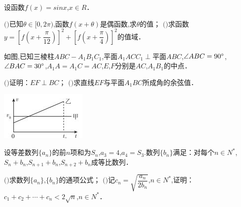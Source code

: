 \question[14] 设函数$f(x)=sinx$,$x \in R$．
\begin{subquestions}
    \subquestion $($$)$已知$ \theta  \in [0 , 2 \pi )$,函数$f(x+ \theta )$是偶函数,求$ \theta $的值；
    \subquestion $($$)$求函数$y=[f(x+ \dfrac { \pi }{12} )] ^{2} +[f(x+ \dfrac { \pi }{4} )] ^{2}$的值域．
\end{subquestions}
\begin{solution}{6cm}

\end{solution}



\question[15] 如图,已知三棱柱$ABC-A _{1} B _{1} C _{1}$,平面$A _{1} ACC _{1}  \perp $平面$ABC$,$ \angle ABC=90^{\small \circ}$,$ \angle BAC=30^{\small \circ}$,$A _{1} A=A _{1} C=AC$,$E$,$F$分别是$AC$,$A _{1} B _{1}$的中点．
\begin{subquestions}
    \subquestion $($$)$证明：$EF \perp BC$；
    \subquestion $($$)$求直线$EF$与平面$A _{1} BC$所成角的余弦值．
\end{subquestions}
\begin{center}
    \includegraphics[]{img/image1.jpeg}
\end{center}
\begin{solution}{6cm}

\end{solution}



\question[15] 设等差数列$\{a _{n} \}$的前$n$项和为$S _{n}$,$a _{3} =4$,$a _{4} =S _{3} .$数列$\{b _{n} \}$满足：对每个$n \in N ^{*}$,$S _{n} +b _{n}$,$S _{n+1} +b _{n}$,$S _{n+2} +b _{n}$成等比数列．
\begin{subquestions}
    \subquestion $($$)$求数列$\{a _{n} \}$,$\{b _{n} \}$的通项公式；
    \subquestion $($$)$记$c _{n} = \sqrt { \dfrac {a_{n}}{2b_{n}}}$,$n \in N ^{*}$,证明：$c _{1} +c _{2} + \cdots +c _{n}  \lt  2 \sqrt {n}$,$n \in N ^{*}$．
\end{subquestions}
\begin{solution}{6cm}

\end{solution}



